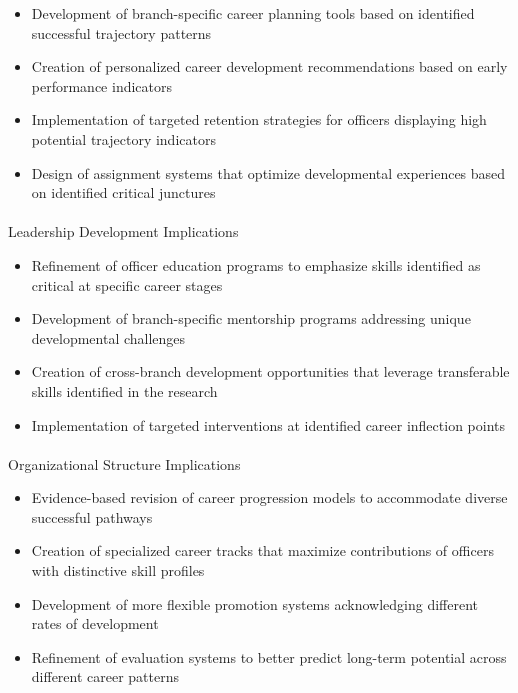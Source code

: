 \documentclass[
  letterpaper,
  DIV=11,
  numbers=noendperiod]{scrartcl}
\makeatletter
\let\oldparagraph\paragraph
\renewcommand{\paragraph}{
    \@ifstar
      \xxxParagraphStar
      \xxxParagraphNoStar
  }
\newcommand{\xxxParagraphStar}[1]{\oldparagraph*{#1}\mbox{}}
\newcommand{\xxxParagraphNoStar}[1]{\oldparagraph{#1}\mbox{}}
\providecommand{\tightlist}{%
  \setlength{\itemsep}{0pt}\setlength{\parskip}{0pt}}
\makeatother
\begin{document}
\begin{itemize}
\tightlist
\item
  Development of branch-specific career planning tools based on
  identified successful trajectory patterns
\item
  Creation of personalized career development recommendations based on
  early performance indicators
\item
  Implementation of targeted retention strategies for officers
  displaying high potential trajectory indicators
\item
  Design of assignment systems that optimize developmental experiences
  based on identified critical junctures
\end{itemize}

\paragraph{Leadership Development
Implications}\label{leadership-development-implications}

\begin{itemize}
\tightlist
\item
  Refinement of officer education programs to emphasize skills
  identified as critical at specific career stages
\item
  Development of branch-specific mentorship programs addressing unique
  developmental challenges
\item
  Creation of cross-branch development opportunities that leverage
  transferable skills identified in the research
\item
  Implementation of targeted interventions at identified career
  inflection points
\end{itemize}

\paragraph{Organizational Structure
Implications}\label{organizational-structure-implications}

\begin{itemize}
\tightlist
\item
  Evidence-based revision of career progression models to accommodate
  diverse successful pathways
\item
  Creation of specialized career tracks that maximize contributions of
  officers with distinctive skill profiles
\item
  Development of more flexible promotion systems acknowledging different
  rates of development
\item
  Refinement of evaluation systems to better predict long-term potential
  across different career patterns
\end{itemize}
\end{document}
